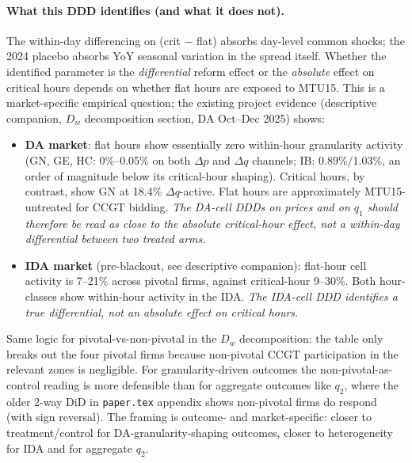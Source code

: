 \documentclass[11pt,a4paper]{article}
\newcommand{\code}[1]{\nolinkurl{#1}}
\begin{document}
\paragraph{What this DDD identifies (and what it does not).}
The within-day differencing on (crit $-$ flat) absorbs day-level common shocks; the 2024 placebo absorbs YoY seasonal variation in the spread itself. Whether the identified parameter is the \emph{differential} reform effect or the \emph{absolute} effect on critical hours depends on whether flat hours are exposed to MTU15. This is a market-specific empirical question; the existing project evidence (descriptive companion, $D_w$ decomposition section, DA Oct--Dec 2025) shows:
\begin{itemize}
    \item \textbf{DA market}: flat hours show essentially zero within-hour granularity activity (GN, GE, HC: 0\%--0.05\% on both $\Delta p$ and $\Delta q$ channels; IB: 0.89\%/1.03\%, an order of magnitude below its critical-hour shaping). Critical hours, by contrast, show GN at 18.4\% $\Delta q$-active. Flat hours are approximately MTU15-untreated for CCGT bidding. \emph{The DA-cell DDDs on prices and on $q_1$ should therefore be read as close to the absolute critical-hour effect, not a within-day differential between two treated arms.}
    \item \textbf{IDA market} (pre-blackout, see descriptive companion): flat-hour cell activity is 7--21\% across pivotal firms, against critical-hour 9--30\%. Both hour-classes show within-hour activity in the IDA. \emph{The IDA-cell DDD identifies a true differential, not an absolute effect on critical hours.}
\end{itemize}
Same logic for pivotal-vs-non-pivotal in the $D_w$ decomposition: the table only breaks out the four pivotal firms because non-pivotal CCGT participation in the relevant zones is negligible. For granularity-driven outcomes the non-pivotal-as-control reading is more defensible than for aggregate outcomes like $q_2$, where the older 2-way DiD in \code{paper.tex} appendix shows non-pivotal firms do respond (with sign reversal). The framing is outcome- and market-specific: closer to treatment/control for DA-granularity-shaping outcomes, closer to heterogeneity for IDA and for aggregate $q_2$.
\end{document}
